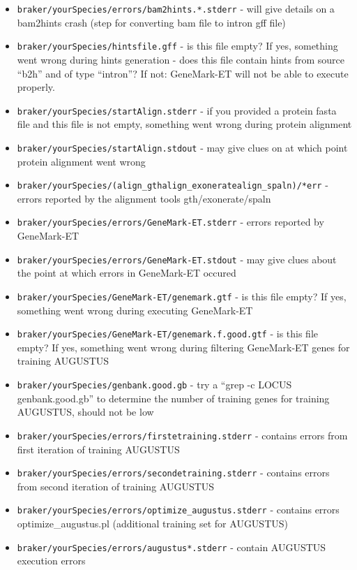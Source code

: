 \documentclass[]{article}
\begin{document}
\begin{itemize}
\item
  \texttt{braker/yourSpecies/errors/bam2hints.*.stderr} - will give
  details on a bam2hints crash (step for converting bam file to intron
  gff file)
\item
  \texttt{braker/yourSpecies/hintsfile.gff} - is this file empty? If
  yes, something went wrong during hints generation - does this file
  contain hints from source ``b2h'' and of type ``intron''? If not:
  GeneMark-ET will not be able to execute properly.
\item
  \texttt{braker/yourSpecies/startAlign.stderr} - if you provided a
  protein fasta file and this file is not empty, something went wrong
  during protein alignment
\item
  \texttt{braker/yourSpecies/startAlign.stdout} - may give clues on at
  which point protein alignment went wrong
\item
  \texttt{braker/yourSpecies/(align\_gth\textbar{}align\_exonerate\textbar{}align\_spaln)/*err}
  - errors reported by the alignment tools gth/exonerate/spaln
\item
  \texttt{braker/yourSpecies/errors/GeneMark-ET.stderr} - errors
  reported by GeneMark-ET
\item
  \texttt{braker/yourSpecies/errors/GeneMark-ET.stdout} - may give clues
  about the point at which errors in GeneMark-ET occured
\item
  \texttt{braker/yourSpecies/GeneMark-ET/genemark.gtf} - is this file
  empty? If yes, something went wrong during executing GeneMark-ET
\item
  \texttt{braker/yourSpecies/GeneMark-ET/genemark.f.good.gtf} - is this
  file empty? If yes, something went wrong during filtering GeneMark-ET
  genes for training AUGUSTUS
\item
  \texttt{braker/yourSpecies/genbank.good.gb} - try a ``grep -c LOCUS
  genbank.good.gb'' to determine the number of training genes for
  training AUGUSTUS, should not be low
\item
  \texttt{braker/yourSpecies/errors/firstetraining.stderr} - contains
  errors from first iteration of training AUGUSTUS
\item
  \texttt{braker/yourSpecies/errors/secondetraining.stderr} - contains
  errors from second iteration of training AUGUSTUS
\item
  \texttt{braker/yourSpecies/errors/optimize\_augustus.stderr} -
  contains errors optimize\_augustus.pl (additional training set for
  AUGUSTUS)
\item
  \texttt{braker/yourSpecies/errors/augustus*.stderr} - contain AUGUSTUS
  execution errors
\end{itemize}
\end{document}
